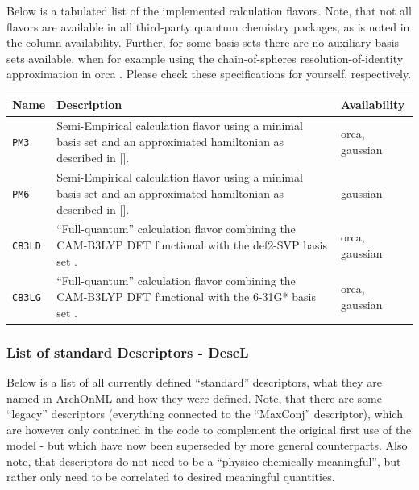 \documentclass[12pt]{achemso}
\begin{document}
Below is a tabulated list of the implemented calculation flavors. Note, that not all flavors are available in all third-party quantum chemistry packages, as is noted in the column availability. Further, for some basis sets there are no auxiliary basis sets available, when for example using the chain-of-spheres resolution-of-identity approximation in orca \cite{NEESE200998}. Please check these specifications for yourself, respectively.

\begin{table}[h!]
    \centering
    \begin{tabular}{p{4cm} | p{8cm} | p{4cm}}
    \hline
    \textbf{Name} &  \textbf{Description}  & \textbf{Availability}\\
    \hline
    \hline

    \verb+PM3+ & Semi-Empirical calculation flavor using a minimal basis set and an approximated hamiltonian as described in [\cite{Stewart_PM3}]. & orca, gaussian\\
    \hline

    \verb+PM6+ & Semi-Empirical calculation flavor using a minimal basis set and an approximated hamiltonian as described in [\cite{Stewart_PM6}]. & gaussian\\
    \hline

    \verb+CB3LD+ & ``Full-quantum'' calculation flavor combining the CAM-B3LYP DFT functional\cite{YANAI200451} with the def2-SVP basis set \cite{B508541A}. & orca, gaussian\\
    \hline

    \verb+CB3LG+ & ``Full-quantum'' calculation flavor combining the CAM-B3LYP DFT functional\cite{YANAI200451} with the 6-31G* basis set \cite{Ditchfield_1971}. & orca, gaussian\\
    \hline

    \end{tabular}
\end{table}

\subsubsection{List of standard Descriptors - DescL}

\noindent Below is a list of all currently defined ``standard'' descriptors, what they are named in ArchOnML and how they were defined. Note, that there are some ``legacy'' descriptors (everything connected to the ``MaxConj'' descriptor), which are however only contained in the code to complement the original first use of the model - but which have now been superseded by more general counterparts. Also note, that descriptors do not need to be a ``physico-chemically meaningful'', but rather only need to be correlated to desired meaningful quantities.
\end{document}
